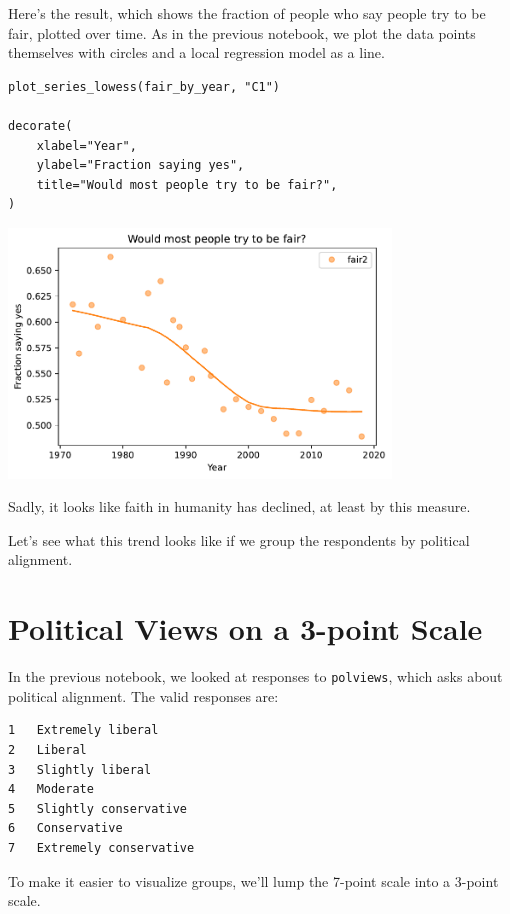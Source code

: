 Here's the result, which shows the fraction of people who say people try
to be fair, plotted over time. As in the previous notebook, we plot the
data points themselves with circles and a local regression model as a
line.

\begin{lstlisting}[]
plot_series_lowess(fair_by_year, "C1")

decorate(
    xlabel="Year",
    ylabel="Fraction saying yes",
    title="Would most people try to be fair?",
)
\end{lstlisting}

\begin{center}
\includegraphics[width=4in]{chapters/03_outlook_files/03_outlook_31_0.pdf}
\end{center}

Sadly, it looks like faith in humanity has declined, at least by this
measure.

Let's see what this trend looks like if we group the respondents by
political alignment.

\hypertarget{political-views-on-a-3-point-scale}{%
\section{Political Views on a 3-point
Scale}\label{political-views-on-a-3-point-scale}}

In the previous notebook, we looked at responses to
\passthrough{\lstinline!polviews!}, which asks about political
alignment. The valid responses are:

\begin{lstlisting}
1   Extremely liberal
2   Liberal
3   Slightly liberal
4   Moderate
5   Slightly conservative
6   Conservative
7   Extremely conservative
\end{lstlisting}

To make it easier to visualize groups, we'll lump the 7-point scale into
a 3-point scale.

